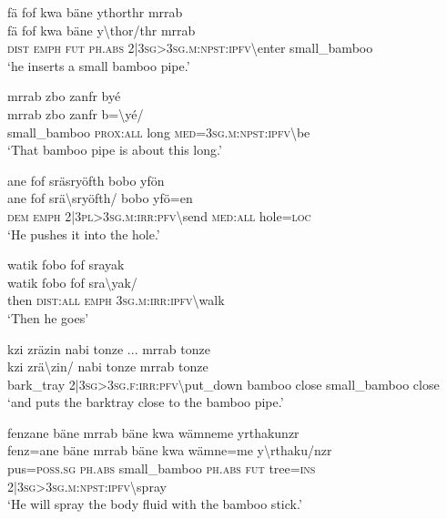 \ea\label{ex:a4279}
fä fof kwa bäne ythorthr mrrab\\
\gll fä	fof	kwa	bäne	y{\textbackslash}thor/thr	mrrab\\
     \textsc{dist}	\textsc{emph}	\textsc{fut}	\textsc{ph}.\textsc{abs}	2|3\textsc{sg}>3\textsc{sg}.\textsc{m}:\textsc{npst}:\textsc{ipfv}{\textbackslash}enter	small\_bamboo\\
\glt `he inserts a small bamboo pipe.'
\z

\ea\label{ex:a4283}
mrrab zbo zanfr byé\\
\gll mrrab	zbo	zanfr	b={\textbackslash}yé/\\
     small\_bamboo	\textsc{prox}:\textsc{all}	long	\textsc{med}=3\textsc{sg}.\textsc{m}:\textsc{npst}:\textsc{ipfv}{\textbackslash}be\\
\glt `That bamboo pipe is about this long.'
\z

\ea\label{ex:a4284}
ane fof sräsryöfth bobo yfön\\
\gll ane	fof	srä{\textbackslash}sryöfth/	bobo	yfö=en\\
     \textsc{dem}	\textsc{emph}	2|3\textsc{pl}>3\textsc{sg}.\textsc{m}:\textsc{irr}:\textsc{pfv}{\textbackslash}send	\textsc{med}:\textsc{all}	hole=\textsc{loc}\\
\glt `He pushes it into the hole.'
\z

\ea\label{ex:a4286}
watik fobo fof srayak\\
\gll watik	fobo	fof	sra{\textbackslash}yak/\\
     then	\textsc{dist}:\textsc{all}	\textsc{emph}	3\textsc{sg}.\textsc{m}:\textsc{irr}:\textsc{ipfv}{\textbackslash}walk\\
\glt `Then he goes'
\z

\ea\label{ex:a4287}
kzi zräzin nabi tonze ... mrrab tonze\\
\gll kzi	zrä{\textbackslash}zin/	nabi	tonze	mrrab	tonze\\
     bark\_tray	2|3\textsc{sg}>3\textsc{sg}.\textsc{f}:\textsc{irr}:\textsc{pfv}{\textbackslash}put\_down	bamboo	close	small\_bamboo	close\\
\glt `and puts the barktray close to the bamboo pipe.'
\z

\ea\label{ex:a4288}
fenzane bäne mrrab bäne kwa wämneme yrthakunzr\\
\gll fenz=ane	bäne	mrrab	bäne	kwa	wämne=me	y{\textbackslash}rthaku/nzr\\
     pus=\textsc{poss}.\textsc{sg}	\textsc{ph}.\textsc{abs}	small\_bamboo	\textsc{ph}.\textsc{abs}	\textsc{fut}	tree=\textsc{ins}	2|3\textsc{sg}>3\textsc{sg}.\textsc{m}:\textsc{npst}:\textsc{ipfv}{\textbackslash}spray\\
\glt `He will spray the body fluid with the bamboo stick.'
\z

